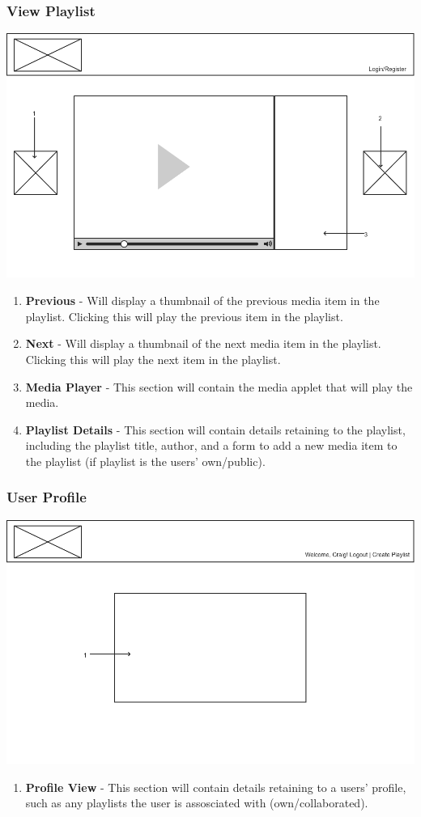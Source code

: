 \documentclass{sig-alt-release2}
\begin{document}
\subsubsection{View Playlist}
\includegraphics[scale=0.3]{img/playlist}
\begin{enumerate}
\item \textbf{Previous} - Will display a thumbnail of the previous media item in the playlist. Clicking this will play the previous item in the playlist.
\item \textbf{Next} - Will display a thumbnail of the next media item in the playlist. Clicking this will play the next item in the playlist.
\item \textbf{Media Player} - This section will contain the media applet that will play the media. 
\item \textbf{Playlist Details} - This section will contain details retaining to the playlist, including the playlist title, author, and a form to add a new media item to the playlist (if playlist is the users' own/public).
\end{enumerate}

\subsubsection{User Profile}
\includegraphics[scale=0.3]{img/userprof}
\begin{enumerate}
\item \textbf{Profile View} - This section will contain details retaining to a users' profile, such as any playlists the user is assosciated with (own/collaborated).
\end{enumerate}
\end{document}
